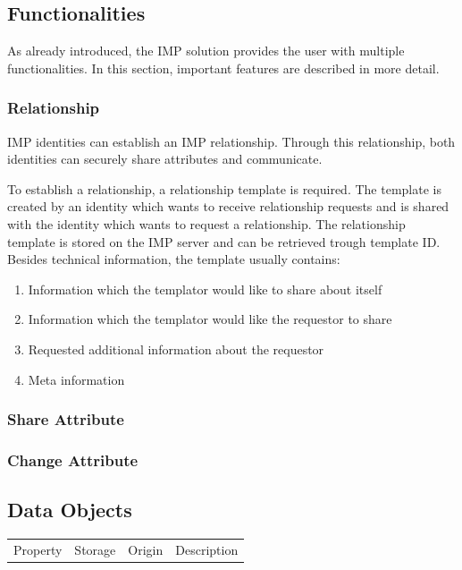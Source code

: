 \documentclass[
     12pt,         %
     a4paper,      %
     BCOR=10mm,version=first,     %
     DIV=14,version=first,        %
     ]{scrreprt}
\begin{document}
\subsection{Functionalities}
As already introduced, the IMP solution provides the user with multiple functionalities. In this section, important features are described in more detail.

\subsubsection{Relationship}

IMP identities can establish an IMP relationship. Through this relationship, both identities can securely share attributes and communicate.

To establish a relationship, a relationship template is required. The template is created by an identity which wants to receive relationship requests and is shared with the identity which wants to request a relationship. The relationship template is stored on the IMP server and can be retrieved trough template ID. Besides technical information, the template usually contains:
\begin{enumerate}
    \item Information which the templator would like to share about itself 
    \item Information which the templator would like the requestor to share
    \item Requested additional information about the requestor 
    \item Meta information 
\end{enumerate}

\subsubsection{Share Attribute}

\subsubsection{Change Attribute}


\subsection{Data Objects}

\begin{table}[!h]
    \begin{tabularx}{\textwidth}{|l|l|l|C|}
    \hline
     \\
    \hline
    Property & Storage & Origin & Description  \\
    \hline
    \hline
    \hline
    \end{tabularx}
\end{table}
\end{document}
